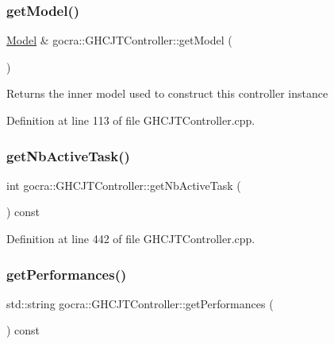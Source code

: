 \subsubsection{\texorpdfstring{get\+Model()}{getModel()}}
{\footnotesize\ttfamily \hyperlink{classocra_1_1Model}{Model} \& gocra\+::\+G\+H\+C\+J\+T\+Controller\+::get\+Model (\begin{DoxyParamCaption}{ }\end{DoxyParamCaption})}

\begin{DoxyReturn}{Returns}
the inner model used to construct this controller instance 
\end{DoxyReturn}


Definition at line 113 of file G\+H\+C\+J\+T\+Controller.\+cpp.

\hypertarget{classgocra_1_1GHCJTController_a9c72545e3995937ae9448428ccce210b}{}\label{classgocra_1_1GHCJTController_a9c72545e3995937ae9448428ccce210b} 
\subsubsection{\texorpdfstring{get\+Nb\+Active\+Task()}{getNbActiveTask()}}
{\footnotesize\ttfamily int gocra\+::\+G\+H\+C\+J\+T\+Controller\+::get\+Nb\+Active\+Task (\begin{DoxyParamCaption}{ }\end{DoxyParamCaption}) const}



Definition at line 442 of file G\+H\+C\+J\+T\+Controller.\+cpp.

\hypertarget{classgocra_1_1GHCJTController_add50119553cb0f5de3f5639523968939}{}\label{classgocra_1_1GHCJTController_add50119553cb0f5de3f5639523968939} 
\subsubsection{\texorpdfstring{get\+Performances()}{getPerformances()}}
{\footnotesize\ttfamily std\+::string gocra\+::\+G\+H\+C\+J\+T\+Controller\+::get\+Performances (\begin{DoxyParamCaption}{ }\end{DoxyParamCaption}) const}

